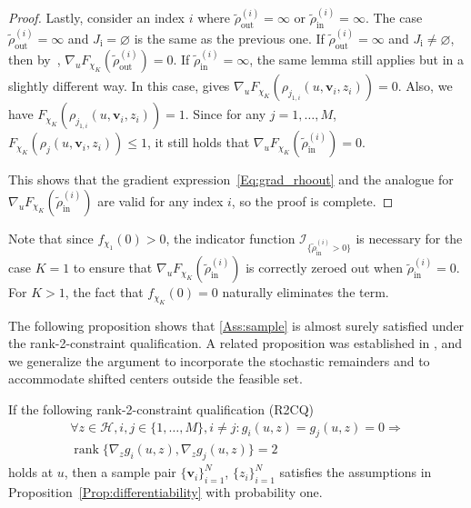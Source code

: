 \documentclass[%
onefignum,onetabnum]{siamonline250211}
\newcommand{\cI}{\mathcal I} \newcommand{\cJ}{\mathcal J}
\begin{document}
\begin{proof}
    Lastly, consider an index $i$ where $\tilde{\rho}_{\mathrm{out}}^{(i)}=\infty$ or $\tilde{\rho}_{\mathrm{in}}^{(i)}=\infty$. The case $\tilde{\rho}_{\mathrm{out}}^{(i)}=\infty$ and $J_{\mathrm{i}}=\varnothing$ is the same as the previous one. If $\tilde{\rho}_{\mathrm{out}}^{(i)}=\infty$ and $J_{\mathrm{i}}\neq\varnothing$, then by~\cite[Lem~3.3]{AcHeZi-AMO24}, $\nabla_u F_{\chi_K}(\tilde{\rho}_{\mathrm{out}}^{(i)})=0$. If $\tilde{\rho}_{\mathrm{in}}^{(i)}=\infty$, the same lemma still applies but in a slightly different way. In this case, \cite[Lem~3.3]{AcHeZi-AMO24} gives $\nabla_u F_{\chi_K}(\rho_{j_{1,i}}(u,\boldsymbol{v}_i,z_i))=0$. Also, we have $F_{\chi_K}(\rho_{j_{1,i}}(u,\boldsymbol{v}_i,z_i))=1$. Since for any $j=1,\dots,M$, $F_{\chi_K}(\rho_{j}(u,\boldsymbol{v}_i,z_i))\leq 1$, it still holds that $\nabla_u F_{\chi_K}(\tilde{\rho}_{\mathrm{in}}^{(i)})=0$.

    This shows that the gradient expression~\eqref{Eq:grad_rhoout} and the analogue for $\nabla_u F_{\chi_K}(\tilde{\rho}_{\mathrm{in}}^{(i)})$ are valid for any index $i$, so the proof is complete.
\end{proof}

Note that since $f_{\chi_1}(0) > 0$, the indicator function $\cI_{\{\tilde{\rho}_{\mathrm{in}}^{(i)} > 0\}}$ is necessary for the case $K=1$ to ensure that $\nabla_u F_{\chi_K}(\tilde{\rho}_{\mathrm{in}}^{(i)})$ is correctly zeroed out when $\tilde{\rho}_{\mathrm{in}}^{(i)} = 0$. For $K > 1$, the fact that $f_{\chi_K}(0) = 0$ naturally eliminates the term.


The following proposition shows that \cref{Ass:sample} is almost surely satisfied under the rank-2-constraint qualification. A related proposition was established in \cite[Lem.~4.3]{AcHe-SIAM17}, and we generalize the argument to incorporate the stochastic remainders and to accommodate shifted centers outside the feasible set.

\begin{proposition}
    If the following rank-2-constraint qualification (R2CQ)
    \begin{equation}\label{Eq:R2CQ}
        \begin{gathered}
            \forall z\in \mathscr{H}, i,j\in\{1,\dots,M\},i\neq j:
            g_i(u,z)=g_j(u,z)=0 \Longrightarrow \\ \operatorname{rank}{\{\nabla_{z}g_i(u,z),\nabla_{z}g_j(u,z)\}}=2
        \end{gathered}
    \end{equation}
    holds at $u$, then a sample pair $\{\boldsymbol{v}_i\}_{i=1}^N$, $\{z_i\}_{i=1}^N$ satisfies the assumptions in Proposition~\ref{Prop:differentiability} with probability one.
\end{proposition}
\end{document}
